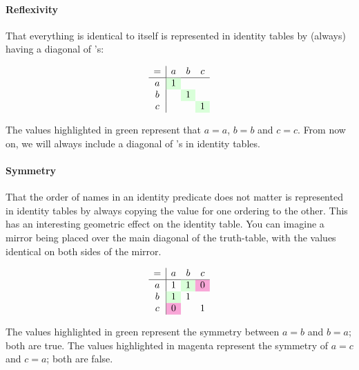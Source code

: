 \documentclass[PHIL101-Textbook.tex]{subfiles}
\begin{document}

\paragraph{Reflexivity}

That everything is identical to itself is represented in identity tables by (always) having a diagonal of \vT's: 

\begin{center}
\[\begin{array}{c|ccc}
	= & a & b & c \\ \hline
	a & \cellcolor{green!15}\vT & & \\
	b & & \cellcolor{green!15}\vT & \\
	c & & & \cellcolor{green!15}\vT \\
\end{array} \]
\end{center}

\noindent The values highlighted in green represent that $a=a$, $b=b$ and $c=c$. From now on, we will always include a diagonal of \vT's in identity tables. 

\paragraph{Symmetry}

That the order of names in an identity predicate does not matter is represented in identity tables by always copying the value for one ordering to the other. This has an interesting geometric effect on the identity table. You can imagine a mirror being placed over the main diagonal of the truth-table, with the values identical on both sides of the mirror. 


\begin{center}
\[\begin{array}{c|ccc}
	= & a & b & c \\ \hline
	a & \vT & \cellcolor{green!15} \vT& \cellcolor{magenta!35} \vF \\
	b & \cellcolor{green!15} \vT & \vT &  \\
	c & \cellcolor{magenta!35} \vF&& \vT \\
\end{array} \]
\end{center}

\noindent The values highlighted in green represent the symmetry between $a=b$ and $b=a$; both are true. The values highlighted in magenta represent the symmetry of $a=c$ and $c=a$; both are false.
\end{document}
